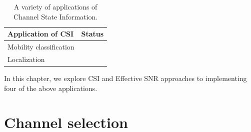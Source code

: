 \begin{table}[htp]
	\centering
	\begin{tabular}{lc}
	\toprule
		\textbf{Application of CSI} & \textbf{Status} \\
	\midrule
		Mobility classification & \secref{sec:esnr_mobility}\\
		Localization \\
	\bottomrule
	\end{tabular}
	\caption{\label{tab:csi_uses}A variety of applications of Channel State Information.}
\end{table}

In this chapter, we explore CSI and Effective SNR approaches to implementing four of the above applications.

\section{Channel selection}\label{sec:esnr_chansel}
